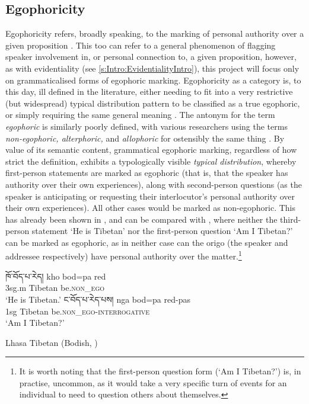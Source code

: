 \subsection{Egophoricity}\label{s:Intro:EgophoricityIntro}
Egophoricity refers, broadly speaking, to the marking of personal authority over a given proposition \cite{EgoIntro}. This too can refer to a general phenomenon of flagging speaker involvement in, or personal connection to, a given proposition, however, as with evidentiality (see \ref{s:Intro:EvidentialityIntro}), this project will focus only on grammaticalised forms of egophoric marking. Egophoricity as a category is, to this day, ill defined in the literature, either needing to fit into a very restrictive (but widespread) typical distribution pattern to be classified as a true egophoric, or simply requiring the same general meaning \cites{EgoIntro}{Gawne2017}. The antonym for the term \textit{egophoric} is similarly poorly defined, with various researchers using the terms \textit{non-egophoric, alterphoric,} and \textit{allophoric} for ostensibly the same thing \cite{Widmer2020}. By value of its semantic content, grammatical egophoric marking, regardless of how strict the definition, exhibits a typologically visible \textit{typical distribution}, whereby first-person statements are marked as egophoric (that is, that the speaker has authority over their own experiences), along with second-person questions (as the speaker is anticipating or requesting their interlocutor's personal authority over their own experiences). All other cases would be marked as non-egophoric. This has already been shown in , and can be compared with , where neither the third-person statement `He is Tibetan' nor the first-person question `Am I Tibetan?' can be marked as egophoric, as in neither case can the origo (the speaker and addressee respectively) have personal authority over the matter.\footnote{It is worth noting that the first-person question form (`Am I Tibetan?') is, in practise, uncommon, as it would take a very specific turn of events for an individual to need to question others about themselves.}

\begin{exe}
\ex\label{ex:EgoDistribution}
\begin{xlist}
\ex \texttibetan{ཁོ་བོད་པ་རེད།}
\gll kho bod=pa red \\
3sg.m Tibetan be.\textsc{non\_ego} \\
\glt `He is Tibetan.'
\ex \texttibetan{ང་བོད་པ་རེད་པས།}
\gll nga bod=pa red-pas \\
1sg Tibetan be.\textsc{non\_ego}-\textsc{interrogative} \\
\glt `Am I Tibetan?'
\end{xlist}
Lhasa Tibetan (Bodish, \tibetnat) \cite[394]{DeLancey2017Tibetan}
\end{exe}

